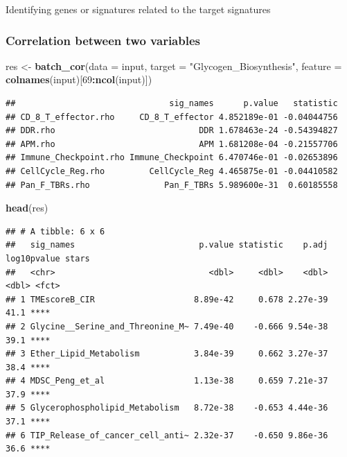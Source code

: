 \documentclass[
  12pt,
]{book}
\newenvironment{Shaded}{\begin{snugshade}}{\end{snugshade}}
\newcommand{\AttributeTok}[1]{\textcolor[rgb]{0.13,0.29,0.53}{#1}}
\newcommand{\DecValTok}[1]{\textcolor[rgb]{0.00,0.00,0.81}{#1}}
\newcommand{\FunctionTok}[1]{\textcolor[rgb]{0.13,0.29,0.53}{\textbf{#1}}}
\newcommand{\NormalTok}[1]{#1}
\newcommand{\OtherTok}[1]{\textcolor[rgb]{0.56,0.35,0.01}{#1}}
\newcommand{\SpecialCharTok}[1]{\textcolor[rgb]{0.81,0.36,0.00}{\textbf{#1}}}
\newcommand{\StringTok}[1]{\textcolor[rgb]{0.31,0.60,0.02}{#1}}
\begin{document}
Identifying genes or signatures related to the target signatures

\hypertarget{correlation-between-two-variables}{%
\subsubsection{Correlation between two variables}\label{correlation-between-two-variables}}

\begin{Shaded}
\begin{Highlighting}[]
\NormalTok{res }\OtherTok{\textless{}{-}} \FunctionTok{batch\_cor}\NormalTok{(}\AttributeTok{data =}\NormalTok{ input, }\AttributeTok{target =} \StringTok{"Glycogen\_Biosynthesis"}\NormalTok{, }\AttributeTok{feature =} \FunctionTok{colnames}\NormalTok{(input)[}\DecValTok{69}\SpecialCharTok{:}\FunctionTok{ncol}\NormalTok{(input)])}
\end{Highlighting}
\end{Shaded}

\begin{verbatim}
##                               sig_names      p.value   statistic
## CD_8_T_effector.rho     CD_8_T_effector 4.852189e-01 -0.04044756
## DDR.rho                             DDR 1.678463e-24 -0.54394827
## APM.rho                             APM 1.681208e-04 -0.21557706
## Immune_Checkpoint.rho Immune_Checkpoint 6.470746e-01 -0.02653896
## CellCycle_Reg.rho         CellCycle_Reg 4.465875e-01 -0.04410582
## Pan_F_TBRs.rho               Pan_F_TBRs 5.989600e-31  0.60185558
\end{verbatim}

\begin{Shaded}
\begin{Highlighting}[]
\FunctionTok{head}\NormalTok{(res)}
\end{Highlighting}
\end{Shaded}

\begin{verbatim}
## # A tibble: 6 x 6
##   sig_names                         p.value statistic    p.adj log10pvalue stars
##   <chr>                               <dbl>     <dbl>    <dbl>       <dbl> <fct>
## 1 TMEscoreB_CIR                    8.89e-42     0.678 2.27e-39        41.1 **** 
## 2 Glycine__Serine_and_Threonine_M~ 7.49e-40    -0.666 9.54e-38        39.1 **** 
## 3 Ether_Lipid_Metabolism           3.84e-39     0.662 3.27e-37        38.4 **** 
## 4 MDSC_Peng_et_al                  1.13e-38     0.659 7.21e-37        37.9 **** 
## 5 Glycerophospholipid_Metabolism   8.72e-38    -0.653 4.44e-36        37.1 **** 
## 6 TIP_Release_of_cancer_cell_anti~ 2.32e-37    -0.650 9.86e-36        36.6 ****
\end{verbatim}
\end{document}
